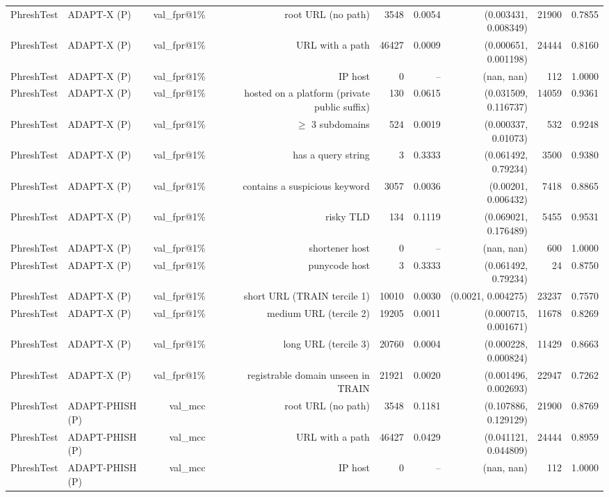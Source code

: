 \begin{table}[t]
\begin{tabular}{llrrrrrrr}
PhreshTest & ADAPT-X (P) & val\_fpr@1\% & root URL (no path) & 3548 & 0.0054 & (0.003431, 0.008349) & 21900 & 0.7855 \\
PhreshTest & ADAPT-X (P) & val\_fpr@1\% & URL with a path & 46427 & 0.0009 & (0.000651, 0.001198) & 24444 & 0.8160 \\
PhreshTest & ADAPT-X (P) & val\_fpr@1\% & IP host & 0 & -- & (nan, nan) & 112 & 1.0000 \\
PhreshTest & ADAPT-X (P) & val\_fpr@1\% & hosted on a platform (private public suffix) & 130 & 0.0615 & (0.031509, 0.116737) & 14059 & 0.9361 \\
PhreshTest & ADAPT-X (P) & val\_fpr@1\% & $\geq$ 3 subdomains & 524 & 0.0019 & (0.000337, 0.01073) & 532 & 0.9248 \\
PhreshTest & ADAPT-X (P) & val\_fpr@1\% & has a query string & 3 & 0.3333 & (0.061492, 0.79234) & 3500 & 0.9380 \\
PhreshTest & ADAPT-X (P) & val\_fpr@1\% & contains a suspicious keyword & 3057 & 0.0036 & (0.00201, 0.006432) & 7418 & 0.8865 \\
PhreshTest & ADAPT-X (P) & val\_fpr@1\% & risky TLD & 134 & 0.1119 & (0.069021, 0.176489) & 5455 & 0.9531 \\
PhreshTest & ADAPT-X (P) & val\_fpr@1\% & shortener host & 0 & -- & (nan, nan) & 600 & 1.0000 \\
PhreshTest & ADAPT-X (P) & val\_fpr@1\% & punycode host & 3 & 0.3333 & (0.061492, 0.79234) & 24 & 0.8750 \\
PhreshTest & ADAPT-X (P) & val\_fpr@1\% & short URL (TRAIN tercile 1) & 10010 & 0.0030 & (0.0021, 0.004275) & 23237 & 0.7570 \\
PhreshTest & ADAPT-X (P) & val\_fpr@1\% & medium URL (tercile 2) & 19205 & 0.0011 & (0.000715, 0.001671) & 11678 & 0.8269 \\
PhreshTest & ADAPT-X (P) & val\_fpr@1\% & long URL (tercile 3) & 20760 & 0.0004 & (0.000228, 0.000824) & 11429 & 0.8663 \\
PhreshTest & ADAPT-X (P) & val\_fpr@1\% & registrable domain unseen in TRAIN & 21921 & 0.0020 & (0.001496, 0.002693) & 22947 & 0.7262 \\
PhreshTest & ADAPT-PHISH (P) & val\_mcc & root URL (no path) & 3548 & 0.1181 & (0.107886, 0.129129) & 21900 & 0.8769 \\
PhreshTest & ADAPT-PHISH (P) & val\_mcc & URL with a path & 46427 & 0.0429 & (0.041121, 0.044809) & 24444 & 0.8959 \\
PhreshTest & ADAPT-PHISH (P) & val\_mcc & IP host & 0 & -- & (nan, nan) & 112 & 1.0000 \\

\end{tabular}
\end{table}
